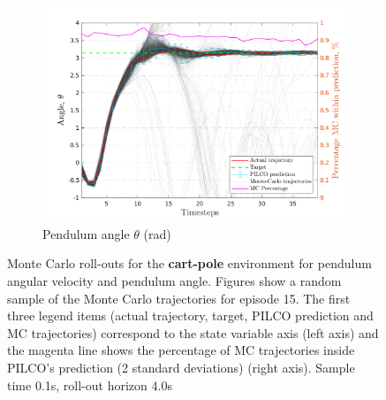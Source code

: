 \begin{figure}[htbp]
  \begin{subfigure}[b]{1\linewidth}
    \centering
    \includegraphics[height=0.4\textheight,width=1\textwidth]{Chapter3/Figures/cp_MC_rollout_Ep_15_Dim_4.png} 
    \caption{Pendulum angle $\theta$ (rad)} 
    \label{Fig:Re-cp-pen-angle} 
  \end{subfigure} 
\caption[Monte Carlo roll-outs for \textbf{cart-pole} pendulum angular velocity and pendulum angle]{Monte Carlo roll-outs for the \textbf{cart-pole} environment for pendulum angular velocity and pendulum angle. Figures show a random sample of the Monte Carlo trajectories for episode 15. The first three legend items (actual trajectory, target, PILCO prediction and MC trajectories) correspond to the state variable axis (left axis) and the magenta line shows the percentage of MC trajectories inside PILCO's prediction (2 standard deviations) (right axis). Sample time 0.1s, roll-out horizon 4.0s}
\label{Fig:Re-cp-MC-roll-outs-2} 
\end{figure}
 
